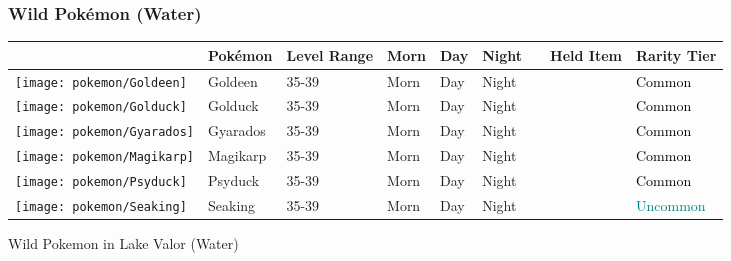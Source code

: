 \subsubsection{Wild Pokémon (Water)}%
\label{ssubsec:WildPokmon(Water)}%
\begin{longtable}{||l l l l l l l l l||}%
\hline%
&Pokémon&Level Range&Morn&Day&Night&&Held Item&Rarity Tier\\%
\hline%
\endhead%
\hline%
\texttt{[image: pokemon/Goldeen]}&Goldeen&35{-}39&Morn&Day&Night&&&\textcolor{black}{%
Common%
}\\%
\hline%
\texttt{[image: pokemon/Golduck]}&Golduck&35{-}39&Morn&Day&Night&&&\textcolor{black}{%
Common%
}\\%
\hline%
\texttt{[image: pokemon/Gyarados]}&Gyarados&35{-}39&Morn&Day&Night&&&\textcolor{black}{%
Common%
}\\%
\hline%
\texttt{[image: pokemon/Magikarp]}&Magikarp&35{-}39&Morn&Day&Night&&&\textcolor{black}{%
Common%
}\\%
\hline%
\texttt{[image: pokemon/Psyduck]}&Psyduck&35{-}39&Morn&Day&Night&&&\textcolor{black}{%
Common%
}\\%
\hline%
\texttt{[image: pokemon/Seaking]}&Seaking&35{-}39&Morn&Day&Night&&&\textcolor{teal}{%
Uncommon%
}\\%
\hline%
\end{longtable}%
\caption{Wild Pokemon in Lake Valor (Water)}